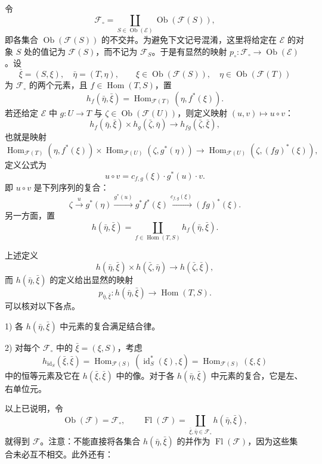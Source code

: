 令
\[
 \mathcal F_\circ=\coprod_{S\in\operatorname{Ob}(\mathcal E)}\operatorname{Ob}(\mathcal F(S)),
\]
即各集合 $\operatorname{Ob}(\mathcal F(S))$ 的不交并。为避免下文记号混淆，这里将给定在 $\mathcal E$ 的对象 $S$ 处的值记为 $\mathcal F(S)$，而不记为 $\mathcal F_S$。于是有显然的映射 $p_\circ:\mathcal F_\circ\to\operatorname{Ob}(\mathcal E)$。设
\[
 \bar\xi=(S,\xi),\quad\bar\eta=(T,\eta),\qquad
 \xi\in\operatorname{Ob}(\mathcal F(S)),\quad\eta\in\operatorname{Ob}(\mathcal F(T))
\]
为 $\mathcal F_\circ$ 的两个元素，且 $f\in\operatorname{Hom}(T,S)$，置
\[
 h_f(\bar\eta,\bar\xi)=\operatorname{Hom}_{\mathcal F(T)}(\eta,f^*(\xi)).
\]
若还给定 $\mathcal E$ 中 $g:U\to T$ 与 $\zeta\in\operatorname{Ob}(\mathcal F(U))$，则定义映射 $(u,v)\mapsto u\circ v$：
\[
 h_f(\bar\eta,\bar\xi)\times h_g(\bar\zeta,\bar\eta)\longrightarrow h_{fg}(\bar\zeta,\bar\xi),
\]
也就是映射
\[
 \operatorname{Hom}_{\mathcal F(T)}(\eta,f^*(\xi))\times
 \operatorname{Hom}_{\mathcal F(U)}(\zeta,g^*(\eta))
 \longrightarrow\operatorname{Hom}_{\mathcal F(U)}(\zeta,(fg)^*(\xi)),
\]
定义公式为
\[
 u\circ v=c_{f,g}(\xi)\cdot g^*(u)\cdot v.
\]
即 $u\circ v$ 是下列序列的复合：
\[
 \zeta\xrightarrow{u}g^*(\eta)\xrightarrow{g^*(u)}g^*f^*(\xi)
 \xrightarrow{c_{f,g}(\xi)}(fg)^*(\xi).
\]
另一方面，置
\[
 h(\bar\eta,\bar\xi)=\coprod_{f\in\operatorname{Hom}(T,S)}h_f(\bar\eta,\bar\xi).
\]

上述定义
\[
 h(\bar\eta,\bar\xi)\times h(\bar\zeta,\bar\eta)\longrightarrow h(\bar\zeta,\bar\xi),
\]
而 $h(\bar\eta,\bar\xi)$ 的定义给出显然的映射
\[
 p_{\bar\eta,\bar\xi}:h(\bar\eta,\bar\xi)\longrightarrow\operatorname{Hom}(T,S).
\]
可以核对以下各点。

1) 各 $h(\bar\eta,\bar\xi)$ 中元素的复合满足结合律。

2) 对每个 $\mathcal F_\circ$ 中的 $\bar\xi=(\xi,S)$，考虑
\[
 h_{\operatorname{id}_S}(\bar\xi,\bar\xi)
 =\operatorname{Hom}_{\mathcal F(S)}(\operatorname{id}_S^*(\xi),\xi)
 =\operatorname{Hom}_{\mathcal F(S)}(\xi,\xi)
\]
中的恒等元素及它在 $h(\bar\xi,\bar\xi)$ 中的像。对于各 $h(\bar\eta,\bar\xi)$ 中元素的复合，它是左、右单位元。

以上已说明，令
\[
 \operatorname{Ob}(\mathcal F)=\mathcal F_\circ,\qquad
 \operatorname{Fl}(\mathcal F)=\coprod_{\bar\xi,\bar\eta\in\mathcal F_\circ}h(\bar\eta,\bar\xi),
\]
就得到 $\mathcal F$。注意：不能直接将各集合 $h(\bar\eta,\bar\xi)$ 的并作为 $\operatorname{Fl}(\mathcal F)$，因为这些集合未必互不相交。此外还有：


